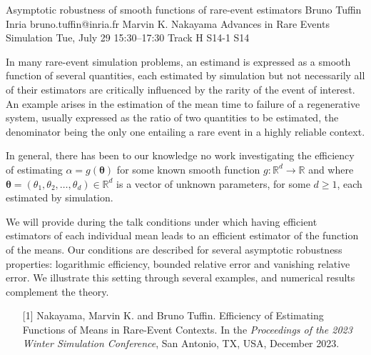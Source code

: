 \begin{talk}
  {Asymptotic robustness of  smooth functions of  rare-event estimators}%
  {Bruno Tuffin}%
  {Inria}%
  {bruno.tuffin@inria.fr}%
  {Marvin K. Nakayama}%
  {Advances in Rare Events Simulation}%
  {Tue, July 29 15:30–17:30 Track H}%
  {S14-1}%
  {S14}%
				
			
In many rare-event simulation problems, an estimand is expressed  as a smooth function of several quantities,  each
estimated by simulation  but not necessarily all of their estimators are critically influenced by
the rarity of the event of interest.  
An example arises in the estimation of the mean time to failure of a regenerative system, usually expressed as the ratio of two quantities to be estimated, the denominator being the only one  entailing a rare event in a highly reliable context.

In general, there has been to our knowledge no work investigating  the efficiency  of estimating $\alpha = g({\boldsymbol{\theta}})$
for some known  smooth function $g : \mathbb{R}^d \to \mathbb{R}$ and where ${\boldsymbol{\theta}} = (\theta_1, \theta_2, \ldots, \theta_d) \in \mathbb{R}^d$ is a vector of unknown parameters, for some $d \geq 1$, each  estimated by simulation.

We will provide during the talk conditions under which having efficient estimators of each individual mean leads to an efficient estimator of the function of the means. Our conditions are described for several asymptotic robustness properties: logarithmic efficiency, bounded relative error and vanishing relative error.
We illustrate this setting through several examples, and numerical results complement the theory.


			

\medskip


\begin{enumerate}
	\item[{[1]}]  Nakayama, Marvin K. and Bruno Tuffin.  Efficiency of Estimating Functions of Means in Rare-Event Contexts. In the {\it Proceedings of the 2023 Winter Simulation Conference}, San Antonio, TX, USA, December 2023.
\end{enumerate}

\end{talk}

